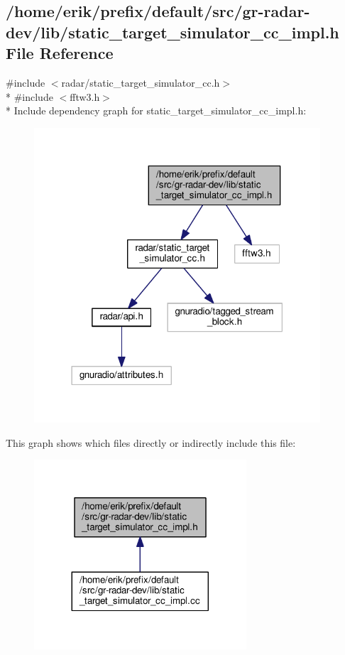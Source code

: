 \subsection{/home/erik/prefix/default/src/gr-\/radar-\/dev/lib/static\+\_\+target\+\_\+simulator\+\_\+cc\+\_\+impl.h File Reference}
\label{static__target__simulator__cc__impl_8h}
{\ttfamily \#include $<$radar/static\+\_\+target\+\_\+simulator\+\_\+cc.\+h$>$}\\*
{\ttfamily \#include $<$fftw3.\+h$>$}\\*
Include dependency graph for static\+\_\+target\+\_\+simulator\+\_\+cc\+\_\+impl.\+h\+:
\nopagebreak
\begin{figure}[H]
\begin{center}
\leavevmode
\includegraphics[width=302pt]{d4/d52/static__target__simulator__cc__impl_8h__incl}
\end{center}
\end{figure}
This graph shows which files directly or indirectly include this file\+:
\nopagebreak
\begin{figure}[H]
\begin{center}
\leavevmode
\includegraphics[width=224pt]{dc/dff/static__target__simulator__cc__impl_8h__dep__incl}
\end{center}
\end{figure}
